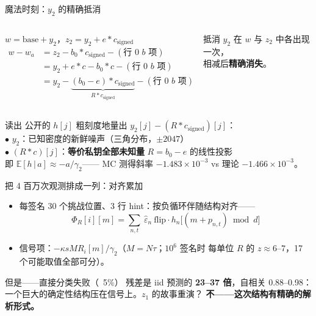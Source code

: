 \documentclass[11pt,aspectratio=169]{ctexbeamer}
\begin{document}
\begin{frame}{魔法时刻：$y_2$ 的精确抵消}
  \begin{columns}[T]
    {\small
    $w = \mathrm{base} + y_2$，\quad $z_2 = y_2 + e*c_{\mathrm{signed}}$
    \begin{align*}
      w - w_a &= z_2 - b_0*c_{\mathrm{signed}} - (\text{行 0 } b\text{ 项})\\
              &= y_2 + e*c - b_0*c - (\text{行 0 } b\text{ 项})\\
              &= y_2 - \underbrace{(b_0 - e)*c_{\mathrm{signed}}}_{R*c_{\mathrm{signed}}}
                 - (\text{行 0 } b\text{ 项})
    \end{align*}}
    \begin{alertblock}{抵消}
      \small $y_2$ 在 $w$ 与 $z_2$ 中各出现一次，\\
      相减后\textbf{精确消失}。
    \end{alertblock}
  \end{columns}
  \vspace{0.3em}
  \begin{block}{读出}
    \small 公开的 $h[j]$ 粗刻度地量出
    $y_2[j] - (R*c_{\mathrm{signed}})[j]$：\\[0.2em]
    $\bullet$ $y_2$：已知密度的新鲜噪声（三角分布，$\pm2047$）\\
    $\bullet$ $(R*c)[j]$：\textbf{等价私钥全部未知量} $R=b_0-e$ 的线性投影\\[0.2em]
    即 $\mathbb{E}[h\,|\,a] \approx -a/\gamma_2$——
    MC 测得斜率 $-1.483\times10^{-3}$ vs 理论 $-1.466\times10^{-3}$。
  \end{block}
\end{frame}

\begin{frame}{把 4 百万次观测排成一列：对齐累加}
  \begin{itemize}
    \item 每签名 30 个挑战位置、3 行 hint：按负循环伴随结构对齐——
          \[
            \Phi_R[i][m] = \sum_{n,t}\ \hat\varepsilon_n\ \mathrm{flip}\cdot
            h_n\bigl[(m+p_{n,t}) \bmod d\bigr]
          \]
    \item 信号项：$-\kappa s M R_i[m]/\gamma_2$（$M=N\tau$；$10^6$ 签名时
          每单位 $R$ 的 $z\approx6$--$7$，17 个可能取值全部可分）。
  \end{itemize}
  \begin{alertblock}{但是——直接分类失败（~5\%）}
    \small 残差是 iid 预测的 \textbf{23--37 倍}，自相关 0.88--0.98：
    一个巨大的确定性结构压在信号上。$z_1$ 的故事重演？
    \textbf{不——这次结构有精确的解析形式。}
  \end{alertblock}
\end{frame}
\end{document}
